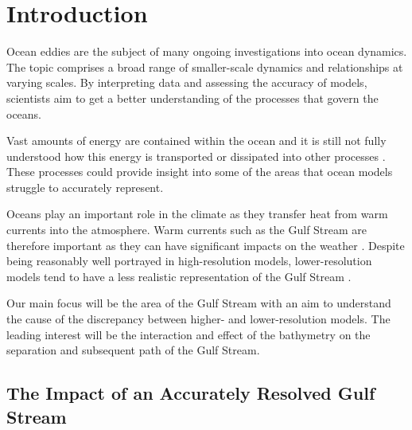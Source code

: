 \documentclass[..\report.tex]{subfiles}
\begin{document}
\section{Introduction}
\label{SEC:Introduction}

Ocean eddies are the subject of many ongoing investigations into ocean dynamics. The topic comprises a broad range of smaller-scale dynamics and relationships at varying scales. By interpreting data and assessing the accuracy of models, scientists aim to get a better understanding of the processes that govern the oceans. \par
Vast amounts of energy are contained within the ocean and it is still not fully understood how this energy is transported or dissipated into other processes \citep{Nikurashin2012a}. These processes could provide insight into some of the areas that ocean models struggle to accurately represent.\par
Oceans play an important role in the climate as they transfer heat from warm currents into the atmosphere. Warm currents such as the Gulf Stream are therefore important as they can have significant impacts on the weather \citep{Scaife2011a}. Despite being reasonably well portrayed in high-resolution models, lower-resolution models tend to have a less realistic representation of the Gulf Stream \citep{Zhang2007}.\par
Our main focus will be the area of the Gulf Stream with an aim to understand the cause of the discrepancy between higher- and lower-resolution models. The leading interest will be the interaction and effect of the bathymetry on the separation and subsequent path of the Gulf Stream.

\subsection{The Impact of an Accurately Resolved Gulf Stream}
\label{SSEC:AccuratelyResolvedGS}
\end{document}
